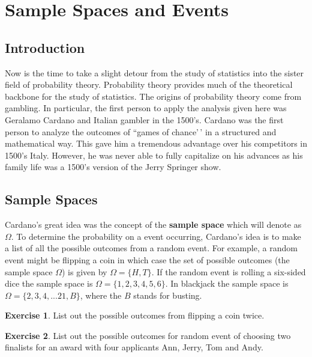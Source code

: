 \documentclass[
]{book}
\theoremstyle{definition}
\theoremstyle{definition}
\theoremstyle{definition}
\newtheorem{exercise}{Exercise}[chapter]
\theoremstyle{definition}
\theoremstyle{remark}
\begin{document}
\hypertarget{sample-spaces-and-events}{%
\section{Sample Spaces and Events}\label{sample-spaces-and-events}}

\hypertarget{introduction}{%
\subsection{Introduction}\label{introduction}}

Now is the time to take a slight detour from the study of statistics into the sister field of probability theory. Probability theory provides much of the theoretical backbone for the study of statistics. The origins of probability theory come from gambling. In particular, the first person to apply the analysis given here was Geralamo Cardano and Italian gambler in the 1500's. Cardano was the first person to analyze the outcomes of ``games of chance'\,' in a structured and mathematical way. This gave him a tremendous advantage over his competitors in 1500's Italy. However, he was never able to fully capitalize on his advances as his family life was a 1500's version of the Jerry Springer show.

\hypertarget{sample-spaces}{%
\subsection{Sample Spaces}\label{sample-spaces}}

Cardano's great idea was the concept of the \textbf{sample space} which will denote as \(\Omega\). To determine the probability on a event occurring, Cardano's idea is to make a list of all the possible outcomes from a random event. For example, a random event might be flipping a coin in which case the set of possible outcomes (the sample space \(\Omega\)) is given by \(\Omega=\{H,T\}\). If the random event is rolling a six-sided dice the sample space is \(\Omega=\{1,2,3,4,5,6\}\). In blackjack the sample space is \(\Omega=\{2,3,4,...21, B\}\), where the \(B\) stands for busting.

\begin{exercise}
\protect\hypertarget{exr:unnamed-chunk-200}{}\label{exr:unnamed-chunk-200}List out the possible outcomes from flipping a coin twice.
\end{exercise}

\begin{exercise}
\protect\hypertarget{exr:unnamed-chunk-201}{}\label{exr:unnamed-chunk-201}List out the possible outcomes for random event of choosing two finalists for an award with four applicants Ann, Jerry, Tom and Andy.
\end{exercise}
\end{document}

